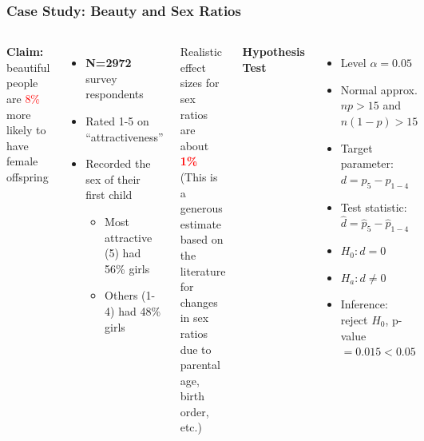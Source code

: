 \documentclass[slidestop,compress,mathserif]{beamer}
\begin{document}
\begin{frame}

	\frametitle{Case Study: Beauty and Sex Ratios}

	\begin{columns}
			\textbf{Claim:} beautiful people are \textcolor{red}{8\%} more likely to have female offspring
			\pause
			\begin{itemize}
				\item \textbf{N=2972} survey respondents
				\item Rated 1-5 on ``attractiveness''
				\item Recorded the sex of their first child
				\begin{itemize}
					\item Most attractive (5) had 56\% girls
					\item Others (1-4) had 48\% girls
				\end{itemize}
			\end{itemize}
			\pause
		\vspace{0.2em}
		\begin{block}{}
			\footnotesize
				\textcolor{green!60!black}{Realistic effect sizes for sex ratios are about \textcolor{red}{\textbf{1\%}} (This is a generous estimate based on the literature for changes in sex ratios due to parental age, birth order, etc.)}
		\end{block}
		\pause
		\vspace{0.5em}
			\textbf{Hypothesis Test}
			\begin{itemize}
				\item Level $\alpha = 0.05$
				\item Normal approx. $np > 15$ and $n(1-p) > 15$ 
				\item Target parameter: $d = p_5 - p_{1-4}$
				\item Test statistic: $\hat{d} = \hat{p}_5 - \hat{p}_{1-4}$
				\item $H_0: d = 0$
				\item $H_a: d \neq 0$
				\item Inference: reject $H_0$, p-value$=0.015<0.05$
			\end{itemize}
	\end{columns}

\end{frame}

\end{document}
